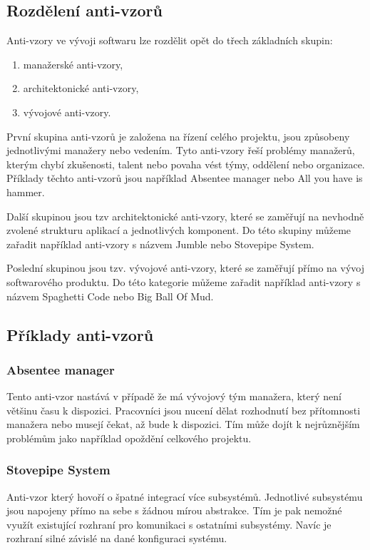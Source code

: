\documentclass[czech,DP]{thesiskiv}
\begin{document}
\subsection{Rozdělení anti-vzorů}
Anti-vzory ve vývoji softwaru lze rozdělit opět do třech základních skupin:
\begin{enumerate}
    \item manažerské anti-vzory,
    \item architektonické anti-vzory,
    \item vývojové anti-vzory.
\end{enumerate}
První skupina anti-vzorů je založena na řízení celého projektu, jsou způsobeny jednotlivými manažery nebo vedením. Tyto anti-vzory řeší problémy manažerů, kterým chybí zkušenosti, talent nebo povaha vést
týmy, oddělení nebo organizace. Příklady těchto anti-vzorů jsou například Absentee manager nebo All you have is hammer.\cite{antipatterns}
\par
Další skupinou jsou tzv architektonické anti-vzory, které se zaměřují na nevhodně zvolené strukturu aplikací a jednotlivých komponent. Do této skupiny můžeme zařadit například anti-vzory s názvem Jumble nebo Stovepipe System. \cite{architecture_antipatterns}
\par
Poslední skupinou jsou tzv. vývojové anti-vzory, které se zaměřují přímo na vývoj softwarového produktu. Do této kategorie můžeme zařadit například anti-vzory s názvem Spaghetti Code nebo Big Ball Of Mud.
\subsection{Příklady anti-vzorů}
\subsubsection{Absentee manager}
Tento anti-vzor nastává v případě že má vývojový tým manažera, který není většinu času k dispozici. Pracovníci jsou nucení dělat rozhodnutí bez přítomnosti manažera nebo musejí čekat, až bude k dispozici. Tím může dojít k nejrůznějším problémům jako například opoždění celkového projektu. \cite{antipatterns}
\subsubsection{Stovepipe System}
Anti-vzor který hovoří o špatné integrací více subsystémů. Jednotlivé subsystému jsou napojeny přímo na sebe s žádnou mírou abstrakce. Tím je pak nemožné využít existující rozhraní pro komunikaci s ostatními subsystémy. Navíc je rozhraní silné závislé na dané konfiguraci systému.\cite{architecture_antipatterns}
\end{document}
